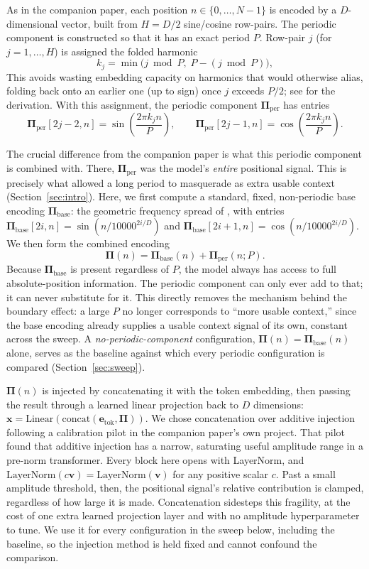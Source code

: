 \documentclass[11pt]{article}
\begin{document}
As in the companion paper, each position $n \in \{0, \ldots, N-1\}$ is encoded by a $D$-dimensional vector, built from $H = D/2$ sine/cosine row-pairs. The periodic component is constructed so that it has an exact period $P$. Row-pair $j$ (for $j = 1, \ldots, H$) is assigned the folded harmonic
\[
k_j = \min\big(j \bmod P,\; P - (j \bmod P)\big),
\]
This avoids wasting embedding capacity on harmonics that would otherwise alias, folding back onto an earlier one (up to sign) once $j$ exceeds $P/2$; see \citet{nabijou2026} for the derivation. With this assignment, the periodic component $\boldsymbol{\Pi}_{\text{per}}$ has entries
\[
\boldsymbol{\Pi}_{\text{per}}[2j-2, n] = \sin\!\left(\frac{2\pi k_j n}{P}\right), \qquad
\boldsymbol{\Pi}_{\text{per}}[2j-1, n] = \cos\!\left(\frac{2\pi k_j n}{P}\right).
\]

The crucial difference from the companion paper is what this periodic component is combined with. There, $\boldsymbol{\Pi}_{\text{per}}$ was the model's \emph{entire} positional signal. This is precisely what allowed a long period to masquerade as extra usable context (Section~\ref{sec:intro}). Here, we first compute a standard, fixed, non-periodic base encoding $\boldsymbol{\Pi}_{\text{base}}$: the geometric frequency spread of \citet{vaswani2017}, with entries $\boldsymbol{\Pi}_{\text{base}}[2i, n] = \sin(n / 10000^{2i/D})$ and $\boldsymbol{\Pi}_{\text{base}}[2i+1, n] = \cos(n / 10000^{2i/D})$. We then form the combined encoding
\[
\boldsymbol{\Pi}(n) = \boldsymbol{\Pi}_{\text{base}}(n) + \boldsymbol{\Pi}_{\text{per}}(n; P).
\]
Because $\boldsymbol{\Pi}_{\text{base}}$ is present regardless of $P$, the model always has access to full absolute-position information. The periodic component can only ever add to that; it can never substitute for it. This directly removes the mechanism behind the boundary effect: a large $P$ no longer corresponds to ``more usable context,'' since the base encoding already supplies a usable context signal of its own, constant across the sweep. A \emph{no-periodic-component} configuration, $\boldsymbol{\Pi}(n) = \boldsymbol{\Pi}_{\text{base}}(n)$ alone, serves as the baseline against which every periodic configuration is compared (Section~\ref{sec:sweep}).

$\boldsymbol{\Pi}(n)$ is injected by concatenating it with the token embedding, then passing the result through a learned linear projection back to $D$ dimensions: $\mathbf{x} = \text{Linear}(\text{concat}(\mathbf{e}_{\text{tok}}, \boldsymbol{\Pi}))$. We chose concatenation over additive injection following a calibration pilot in the companion paper's own project. That pilot found that additive injection has a narrow, saturating useful amplitude range in a pre-norm transformer. Every block here opens with LayerNorm, and $\text{LayerNorm}(c\mathbf{v}) = \text{LayerNorm}(\mathbf{v})$ for any positive scalar $c$. Past a small amplitude threshold, then, the positional signal's relative contribution is clamped, regardless of how large it is made. Concatenation sidesteps this fragility, at the cost of one extra learned projection layer and with no amplitude hyperparameter to tune. We use it for every configuration in the sweep below, including the baseline, so the injection method is held fixed and cannot confound the comparison.
\end{document}
